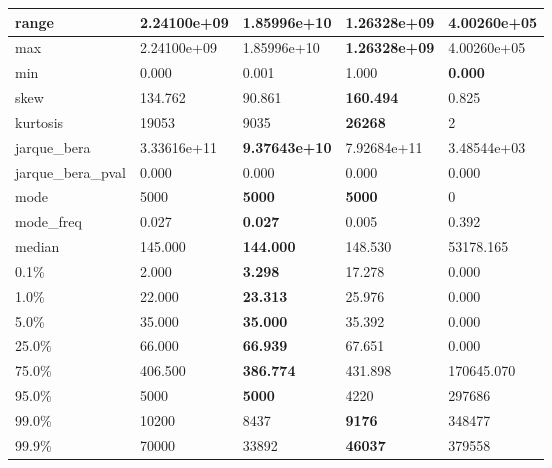 \begin{table}[H]
\begin{tabular}{|l|m{10em}|m{10em}|m{10em}|m{10em}|}
\hline range & 2.24100e+09 & \cellcolor[rgb]{0.9, 0.54, 0.52} 1.85996e+10 & \bfseries 1.26328e+09 & 4.00260e+05 \\
\hline max & 2.24100e+09 & \cellcolor[rgb]{0.9, 0.54, 0.52} 1.85996e+10 & \bfseries 1.26328e+09 & 4.00260e+05 \\
\hline min & 0.000 & 0.001 & \cellcolor[rgb]{0.9, 0.54, 0.52} 1.000 & \bfseries 0.000 \\
\hline skew & 134.762 & 90.861 & \bfseries 160.494 & \cellcolor[rgb]{0.9, 0.54, 0.52} 0.825 \\
\hline kurtosis & 19053 & 9035 & \bfseries 26268 & \cellcolor[rgb]{0.9, 0.54, 0.52} 2 \\
\hline jarque\_bera & 3.33616e+11 & \bfseries 9.37643e+10 & \cellcolor[rgb]{0.9, 0.54, 0.52} 7.92684e+11 & 3.48544e+03 \\
\hline jarque\_bera\_pval & 0.000 & 0.000 & 0.000 & 0.000 \\
\hline mode & 5000 & \bfseries 5000 & \bfseries 5000 & \cellcolor[rgb]{0.9, 0.54, 0.52} 0 \\
\hline mode\_freq & 0.027 & \bfseries 0.027 & 0.005 & \cellcolor[rgb]{0.9, 0.54, 0.52} 0.392 \\
\hline median & 145.000 & \bfseries 144.000 & 148.530 & \cellcolor[rgb]{0.9, 0.54, 0.52} 53178.165 \\
\hline 0.1\% & 2.000 & \bfseries 3.298 & \cellcolor[rgb]{0.9, 0.54, 0.52} 17.278 & 0.000 \\
\hline 1.0\% & 22.000 & \bfseries 23.313 & 25.976 & \cellcolor[rgb]{0.9, 0.54, 0.52} 0.000 \\
\hline 5.0\% & 35.000 & \bfseries 35.000 & 35.392 & \cellcolor[rgb]{0.9, 0.54, 0.52} 0.000 \\
\hline 25.0\% & 66.000 & \bfseries 66.939 & 67.651 & \cellcolor[rgb]{0.9, 0.54, 0.52} 0.000 \\
\hline 75.0\% & 406.500 & \bfseries 386.774 & 431.898 & \cellcolor[rgb]{0.9, 0.54, 0.52} 170645.070 \\
\hline 95.0\% & 5000 & \bfseries 5000 & 4220 & \cellcolor[rgb]{0.9, 0.54, 0.52} 297686 \\
\hline 99.0\% & 10200 & 8437 & \bfseries 9176 & \cellcolor[rgb]{0.9, 0.54, 0.52} 348477 \\
\hline 99.9\% & 70000 & 33892 & \bfseries 46037 & \cellcolor[rgb]{0.9, 0.54, 0.52} 379558 \\
\hline
\end{tabular}
\end{table}
